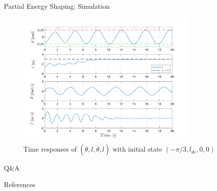 \documentclass[10pt]{beamer}
\begin{document}
 \begin{frame}{Partial Energy Shaping: Simulation}
    \begin{figure}
      \caption*{Time responses of $(\theta, l, \dot{\theta}, \dot{l})$ with 
        initial state $(-\pi/3, l_{de}, 0, 0)$}
      \vspace{-0.3cm}
      \includegraphics[width=0.8\textwidth]{images/partial_2b.pdf}
    \end{figure}
  \end{frame}

\begin{frame}[standout]
    Q\&A
  \end{frame}

  \appendix

  \begin{frame}{References}
    
    
  \end{frame}
\end{document}
